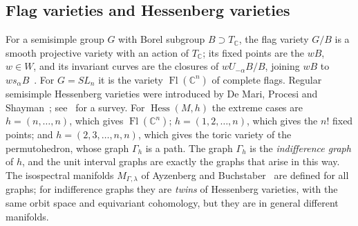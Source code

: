 \documentclass[11pt,a4paper]{article}
\numberwithin{equation}{section}
\theoremstyle{plain}
\theoremstyle{definition}
\theoremstyle{remark}
\newcommand{\C}{\mathbb{C}}
\DeclareMathOperator{\Fl}{Fl}
\DeclareMathOperator{\Hess}{Hess}
\begin{document}
\subsection{Flag varieties and Hessenberg varieties}\label{app:hess}
For a semisimple group $G$ with Borel subgroup $B\supset T_\C$, the flag variety $G/B$ is a smooth projective variety with an action of $T_\C$; its fixed points are the $wB$, $w\in W$, and its invariant curves are the closures of $wU_{-\alpha}B/B$, joining $wB$ to $ws_\alpha B$~\cite{Bri05}. For $G=SL_n$ it is the variety $\Fl(\C^n)$ of complete flags. Regular semisimple Hessenberg varieties were introduced by De Mari, Procesi and Shayman~\cite{DPS92}; see~\cite{AH20} for a survey. For $\Hess(M,h)$ the extreme cases are $h=(n,\dots,n)$, which gives $\Fl(\C^n)$; $h=(1,2,\dots,n)$, which gives the $n!$ fixed points; and $h=(2,3,\dots,n,n)$, which gives the toric variety of the permutohedron, whose graph $\Gamma_h$ is a path. The graph $\Gamma_h$ is the \emph{indifference graph} of $h$, and the unit interval graphs are exactly the graphs that arise in this way. The isospectral manifolds $M_{\Gamma,\lambda}$ of Ayzenberg and Buchstaber~\cite{AB21,AB24} are defined for all graphs; for indifference graphs they are \emph{twins} of Hessenberg varieties, with the same orbit space and equivariant cohomology, but they are in general different manifolds.
\end{document}
